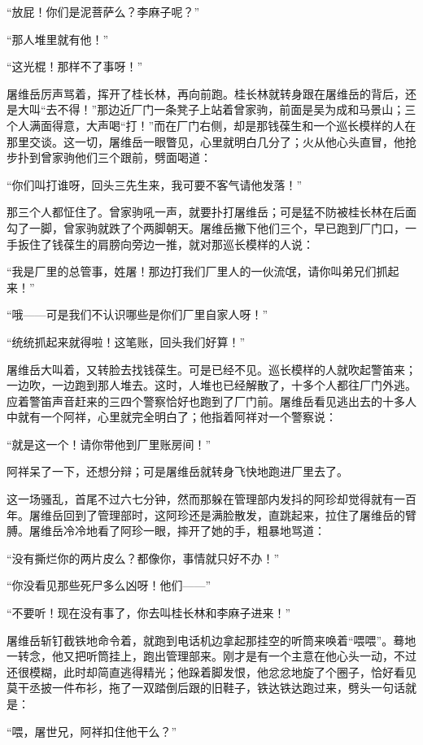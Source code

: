 \par “放屁！你们是泥菩萨么？李麻子呢？”
\par “那人堆里就有他！”
\par “这光棍！那样不了事呀！”
\par 屠维岳厉声骂着，挥开了桂长林，再向前跑。桂长林就转身跟在屠维岳的背后，还是大叫“去不得！”那边近厂门一条凳子上站着曾家驹，前面是吴为成和马景山；三个人满面得意，大声喝“打！”而在厂门右侧，却是那钱葆生和一个巡长模样的人在那里交谈。这一切，屠维岳一眼瞥见，心里就明白几分了；火从他心头直冒，他抢步扑到曾家驹他们三个跟前，劈面喝道：
\par “你们叫打谁呀，回头三先生来，我可要不客气请他发落！”
\par 那三个人都怔住了。曾家驹吼一声，就要扑打屠维岳；可是猛不防被桂长林在后面勾了一脚，曾家驹就跌了个两脚朝天。屠维岳撇下他们三个，早已跑到厂门口，一手扳住了钱葆生的肩膀向旁边一推，就对那巡长模样的人说：
\par “我是厂里的总管事，姓屠！那边打我们厂里人的一伙流氓，请你叫弟兄们抓起来！”
\par “哦——可是我们不认识哪些是你们厂里自家人呀！”
\par “统统抓起来就得啦！这笔账，回头我们好算！”
\par 屠维岳大叫着，又转脸去找钱葆生。可是已经不见。巡长模样的人就吹起警笛来；一边吹，一边跑到那人堆去。这时，人堆也已经解散了，十多个人都往厂门外逃。应着警笛声音赶来的三四个警察恰好也跑到了厂门前。屠维岳看见逃出去的十多人中就有一个阿祥，心里就完全明白了；他指着阿祥对一个警察说：
\par “就是这一个！请你带他到厂里账房间！”
\par 阿祥呆了一下，还想分辩；可是屠维岳就转身飞快地跑进厂里去了。
\par 这一场骚乱，首尾不过六七分钟，然而那躲在管理部内发抖的阿珍却觉得就有一百年。屠维岳回到了管理部时，这阿珍还是满脸散发，直跳起来，拉住了屠维岳的臂膊。屠维岳冷冷地看了阿珍一眼，摔开了她的手，粗暴地骂道：
\par “没有撕烂你的两片皮么？都像你，事情就只好不办！”
\par “你没看见那些死尸多么凶呀！他们——”
\par “不要听！现在没有事了，你去叫桂长林和李麻子进来！”
\par 屠维岳斩钉截铁地命令着，就跑到电话机边拿起那挂空的听筒来唤着“喂喂”。蓦地一转念，他又把听筒挂上，跑出管理部来。刚才是有一个主意在他心头一动，不过还很模糊，此时却简直逃得精光；他跺着脚发恨，他忿忿地旋了个圈子，恰好看见莫干丞披一件布衫，拖了一双踏倒后跟的旧鞋子，铁达铁达跑过来，劈头一句话就是：
\par “喂，屠世兄，阿祥扣住他干么？”
